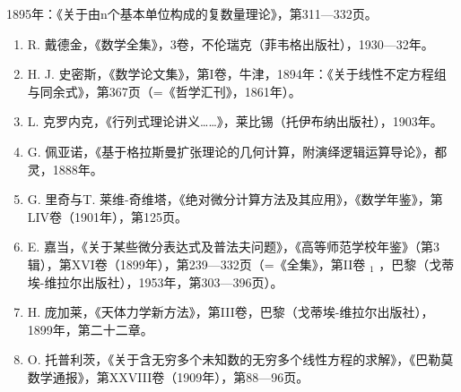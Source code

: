 1895年：《关于由n个基本单位构成的复数量理论》，第311—332页。

\begin{enumerate}
\def\labelenumi{\arabic{enumi}.}
\setcounter{enumi}{23}
\item
  R. 戴德金，《数学全集》，3卷，不伦瑞克（菲韦格出版社），1930—32年。
\item
  H. J. 史密斯，《数学论文集》，第I卷，牛津，1894年：《关于线性不定方程组与同余式》，第367页（=《哲学汇刊》，1861年）。
\item
  L. 克罗内克，《行列式理论讲义……》，莱比锡（托伊布纳出版社），1903年。
\item
  G. 佩亚诺，《基于格拉斯曼扩张理论的几何计算，附演绎逻辑运算导论》，都灵，1888年。
\item
  G. 里奇与T. 莱维-奇维塔，《绝对微分计算方法及其应用》，《数学年鉴》，第LIV卷（1901年），第125页。
\item
  E. 嘉当，《关于某些微分表达式及普法夫问题》，《高等师范学校年鉴》（第3辑），第XVI卷（1899年），第239—332页（=《全集》，第II卷 \(_{1}\) ，巴黎（戈蒂埃-维拉尔出版社），1953年，第303—396页）。
\item
  H. 庞加莱，《天体力学新方法》，第III卷，巴黎（戈蒂埃-维拉尔出版社），1899年，第二十二章。
\item
  O. 托普利茨，《关于含无穷多个未知数的无穷多个线性方程的求解》，《巴勒莫数学通报》，第XXVIII卷（1909年），第88—96页。
\end{enumerate}

